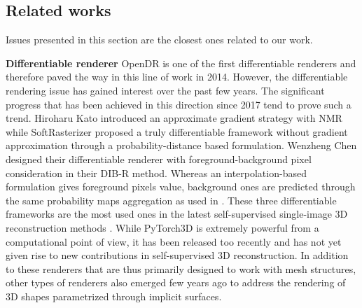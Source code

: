 \subsection{Related works}
\label{sec:related_works}

Issues presented in this section are the closest ones related to our work. \newline 

\noindent\textbf{Differentiable renderer} OpenDR \citep{loper2014opendr} is one of the first differentiable renderers and therefore paved the way in this line of work in 2014. However, the differentiable rendering issue has gained interest over the past few years. The significant progress that has been achieved in this direction since 2017 tend to prove such a trend. Hiroharu Kato \etal introduced an approximate gradient strategy with NMR\citep{kato2018neural} while SoftRasterizer\citep{liu2019soft} proposed a truly differentiable framework without gradient approximation through a probability-distance based formulation. Wenzheng Chen \etal designed their differentiable renderer with foreground-background pixel consideration in their DIB-R \citep{chen2019learning} method. Whereas an interpolation-based formulation gives foreground pixels value, background ones are predicted through the same probability maps aggregation as used in \citep{liu2019soft}. These three differentiable frameworks are the most used ones in the latest self-supervised single-image 3D reconstruction methods \citep{kanazawa2018learning,li2020self,pavllo2020convolutional}. While PyTorch3D \citep{ravi2020accelarating} is extremely powerful from a computational point of view, it has been released too recently and has not yet given rise to new contributions in self-supervised 3D reconstruction. In addition to these renderers that are thus primarily designed to work with mesh structures, other types of renderers\citep{niemeyer2020differentiable,jiang2020sdfdiff} also emerged few years ago to address the rendering of 3D shapes parametrized through implicit surfaces. 


